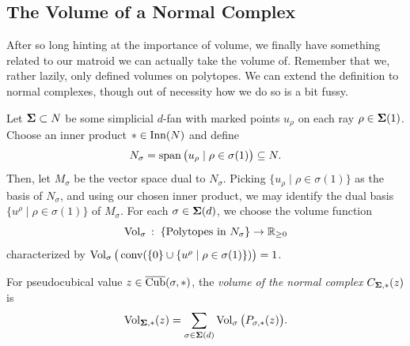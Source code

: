 \documentclass[12pt,oneside]{../../sfsuthesis}
\begin{document}


\subsection{The Volume of a Normal Complex}
After so long hinting at the importance of volume, we finally have something related to our matroid we can actually take the volume of.
Remember that we, rather lazily, only defined volumes on polytopes.
We can extend the definition to normal complexes, though out of necessity how we do so is a bit fussy.
\begin{definition}\th\label{def:volNormalComplex}
    Let \( \bm{\Sigma} \subset N \) be some simplicial \( d \)-fan with marked points \( u_\rho \) on each ray \( \rho \in \bm{\Sigma}(1) \).
    Choose an inner product \( \ast \in \operatorname{Inn}(N) \) and define
    \[
        N_\sigma = \operatorname{span}\big(u_\rho \; | \; \rho \in \sigma(1)\big) \subseteq N.
    \]
    Then, let \( M_\sigma \) be the vector space dual to \( N_\sigma \).
    Picking \( \{ u_\rho \; | \; \rho \in \sigma(1) \} \) as the basis of \( N_\sigma \), and using our chosen inner product, we may identify the dual basis \( \{ u^\rho \; | \; \rho \in \sigma(1) \} \) of \( M_\sigma \).
    For each \( \sigma \in \bm{\Sigma}(d) \), we choose the volume function
    \[
        \operatorname{Vol}_\sigma \,:\; \{\text{Polytopes in \( N_\sigma \)} \}  \to \mathbb{R}_{\geq 0}
    \]
    characterized by \( \operatorname{Vol}_\sigma\big( \operatorname{conv}( \{0\} \cup \{u^\rho \; | \; \rho \in \sigma(1)\})\big) = 1 \).

    For pseudocubical value \( z \in \operatorname{\overline{Cub}}(\sigma, \ast) \), the \emph{volume of the normal complex} \(  C_{\bm{\Sigma}, \ast}(z) \) is
    \[
        \operatorname{Vol}_{\bm{\Sigma}, \ast}(z) = \sum_{\sigma \in \bm{\Sigma}(d)} \operatorname{Vol}_\sigma\big(P_{\sigma, \ast}(z)\big).
    \]
\end{definition}
\end{document}
